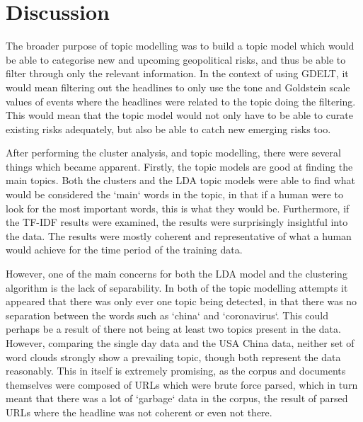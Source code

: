 \section{Discussion}
\label{discussion}
The broader purpose of topic modelling was to build a topic model which would be able to categorise new and upcoming geopolitical risks, and thus be able to filter through only the relevant information. In the context of using GDELT, it would mean filtering out the headlines to only use the tone and Goldstein scale values of events where the headlines were related to the topic doing the filtering. This would mean that the topic model would not only have to be able to curate existing risks adequately, but also be able to catch new emerging risks too.

After performing the cluster analysis, and topic modelling, there were several things which became apparent. Firstly, the topic models are good at finding the main topics. Both the clusters and the LDA topic models were able to find what would be considered the `main` words in the topic, in that if a human were to look for the most important words, this is what they would be. Furthermore, if the TF-IDF results were examined, the results were surprisingly insightful into the data. The results were mostly coherent and representative of what a human would achieve for the time period of the training data.

However, one of the main concerns for both the LDA model and the clustering algorithm is the lack of separability. In both of the topic modelling attempts it appeared that there was only ever one topic being detected, in that there was no separation between the words such as `china` and `coronavirus`. This could perhaps be a result of there not being at least two topics present in the data. However, comparing the single day data and the USA China data, neither set of word clouds strongly show a prevailing topic, though both represent the data reasonably. This in itself is extremely promising, as the corpus and documents themselves were composed of URLs which were brute force parsed, which in turn meant that there was a lot of `garbage` data in the corpus, the result of parsed URLs where the headline was not coherent or even not there.

